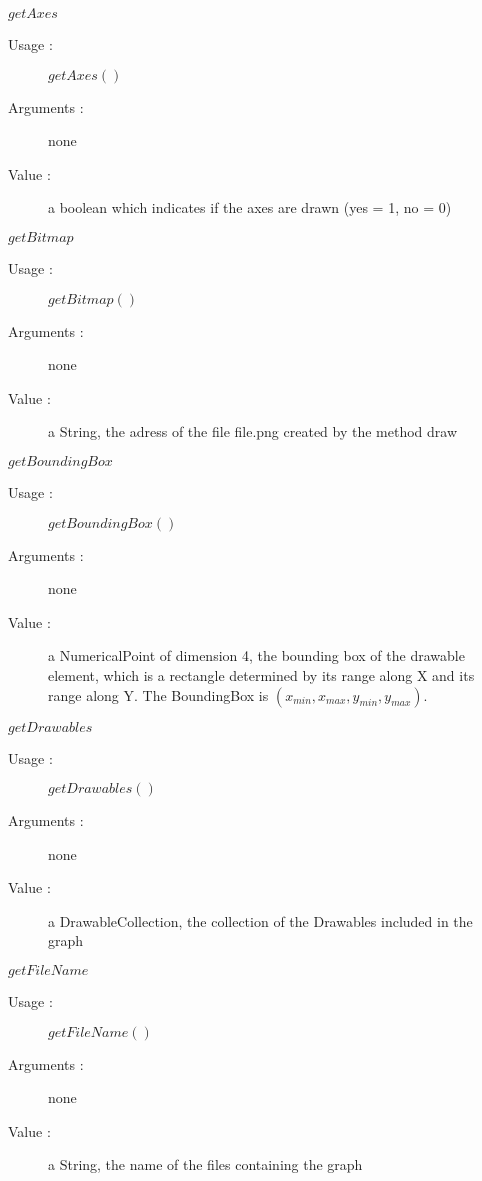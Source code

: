 \begin{description}
\begin{description}
  \item $getAxes$
    \begin{description}
    \item[Usage :] $getAxes()$
    \item[Arguments :] none
    \item[Value :] a boolean which indicates if the axes are drawn (yes = 1, no = 0)
    \end{description}
    \bigskip

  \item $getBitmap$
    \begin{description}
    \item[Usage :] $getBitmap()$
    \item[Arguments :] none
    \item[Value :] a String, the adress of the file file.png created by the method draw
    \end{description}
    \bigskip

  \item $getBoundingBox$
    \begin{description}
    \item[Usage :] $getBoundingBox()$
    \item[Arguments :] none
    \item[Value :] a NumericalPoint of dimension 4, the bounding box of the drawable element, which is a rectangle determined by its range along X and its range along Y. The BoundingBox is  $(x_{min}, x_{max}, y_{min}, y_{max})$.
    \end{description}
    \bigskip

  \item $getDrawables$
    \begin{description}
    \item[Usage :] $getDrawables()$
    \item[Arguments :] none
    \item[Value :] a DrawableCollection, the collection of the Drawables included in the graph
    \end{description}
    \bigskip

  \item $getFileName$
    \begin{description}
    \item[Usage :] $getFileName()$
    \item[Arguments :] none
    \item[Value :] a String, the name of the files containing the graph
    \end{description}
    \bigskip


\end{description}
\end{description}

